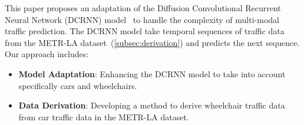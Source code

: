 This paper proposes an adaptation of the Diffusion Convolutional Recurrent Neural Network (DCRNN) model~\cite{DCRNN} to handle the complexity of multi-modal traffic prediction.
The DCRNN model take temporal sequences of traffic data from the METR-LA dataset~(\ref{subsec:derivation}) and predicts the next sequence.
Our approach includes:
\begin{itemize}
    \item \textbf{Model Adaptation}:
    Enhancing the DCRNN model to take into account specifically cars and wheelchairs.
    \item \textbf{Data Derivation}:
    Developing a method to derive wheelchair traffic data from car traffic data in the METR-LA dataset.
\end{itemize}
\vspace{1em}
